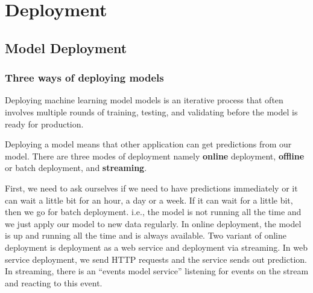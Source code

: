\documentclass[letterpaper,12pt,notitlepage,twoside]{report}
\begin{document}
\chapter{Deployment} \label{ch:4}
\section{Model Deployment}
\subsection{Three ways of deploying models}
 \begin{funfact}[frametitle=\facttitlep{Fun Fact}{Deploying ML models}]
Deploying machine learning model models is an iterative process that often involves multiple rounds of training, testing, and validating before the model is ready for production.
\end{funfact}

Deploying a model means that other application can get predictions from our model. There are three modes of deployment namely \textbf{online} deployment, \textbf{offline} or batch deployment, and \textbf{streaming}.

First, we need to ask ourselves if we need to have predictions immediately or it can wait a little bit for an hour, a day or a week. If it can wait for a little bit, then we go for batch deployment. i.e., the model is not running all the time and we just apply our model to new data regularly. In online deployment, the model is up and running all the time and is always available. Two variant of online deployment is deployment as a web service and deployment via streaming. In web service deployment, we send HTTP requests and the service sends out prediction. In streaming, there is an ``events model service'' listening for events on the stream and reacting to this event. 
\end{document}
